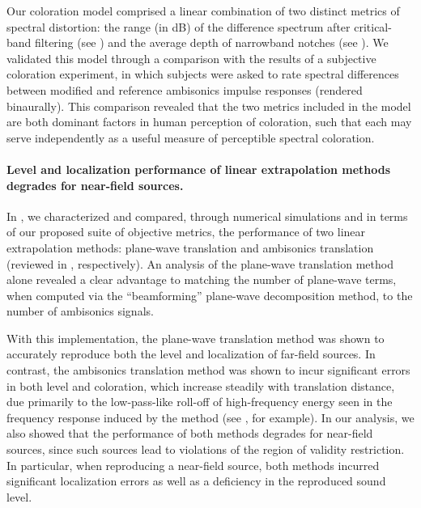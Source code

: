 Our coloration model comprised a linear combination of two distinct metrics of spectral distortion: the range (in dB) of the difference spectrum after critical-band filtering (see ) and the average depth of narrowband notches (see ).
We validated this model through a comparison with the results of a subjective coloration experiment, in which subjects were asked to rate spectral differences between modified and reference ambisonics impulse responses (rendered binaurally).
This comparison revealed that the two metrics included in the model are both dominant factors in human perception of coloration, such that each may serve independently as a useful measure of perceptible spectral coloration.

\paragraph{Level and localization performance of linear extrapolation methods degrades for near-field sources.}
In , we characterized and compared, through numerical simulations and in terms of our proposed suite of objective metrics, the performance of two linear extrapolation methods: plane-wave translation and ambisonics translation (reviewed in , respectively).
An analysis of the plane-wave translation method alone revealed a clear advantage to matching the number of plane-wave terms, when computed via the ``beamforming'' plane-wave decomposition method, to the number of ambisonics signals.

With this implementation, the plane-wave translation method was shown to accurately reproduce both the level and localization of far-field sources.
In contrast, the ambisonics translation method was shown to incur significant errors in both level and coloration, which increase steadily with translation distance, due primarily to the low-pass-like roll-off of high-frequency energy seen in the frequency response induced by the method (see , for example).
In our analysis, we also showed that the performance of both methods degrades for near-field sources, since such sources lead to violations of the region of validity restriction.
In particular, when reproducing a near-field source, both methods incurred significant localization errors as well as a deficiency in the reproduced sound level.

